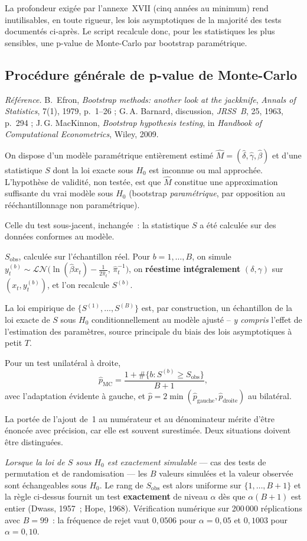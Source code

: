 \documentclass[a4paper,11pt]{article}
\newcommand{\refl}[1]{{\small\textcolor{maincolor!70!black}{\textit{Référence.} #1}}\par\smallskip}
\newcounter{ficheid}
\newenvironment{fiche}[1]{%
  \stepcounter{ficheid}%
  \phantomsection
  \subsection{#1}%
  \label{fiche:\theficheid}%
}{%
  \end{description}\vspace{0.5em}%
}
\newcommand{\Cadre}{%
  \begin{description}[leftmargin=0pt, style=unboxed, itemsep=3pt, topsep=3pt, parsep=2pt]%
  \item[\textcolor{financeblue}{\textbf{1. Cadre, notations et hypothèses de validité (non testées).}}]}
\newcommand{\Hzero}{\item[\textcolor{financeblue}{\textbf{2. Hypothèse nulle.}}]}
\newcommand{\Stat}{\item[\textcolor{financeblue}{\textbf{3. Statistique de test.}}]}
\newcommand{\Loi}{\item[\textcolor{financeblue}{\textbf{4. Loi sous $H_0$.}}]}
\newcommand{\Pval}{\item[\textcolor{financeblue}{\textbf{5. p-value.}}]}
\begin{document}
La profondeur exigée par l'annexe~XVII (cinq années au minimum) rend inutilisables, en toute
rigueur, les lois asymptotiques de la majorité des tests documentés ci-après. Le script
recalcule donc, pour les statistiques les plus sensibles, une p-value de Monte-Carlo par
bootstrap paramétrique.

\begin{fiche}{Procédure générale de p-value de Monte-Carlo}
\refl{B.~Efron, \emph{Bootstrap methods: another look at the jackknife}, \emph{Annals of
Statistics}, 7(1), 1979, p.~1--26 ; G.\,A. Barnard, discussion, \emph{JRSS~B}, 25, 1963, p.~294 ;
J.\,G. MacKinnon, \emph{Bootstrap hypothesis testing}, in \emph{Handbook of Computational
Econometrics}, Wiley, 2009.}
\Cadre
On dispose d'un modèle paramétrique entièrement estimé
$\widehat{M} = (\hat\delta,\hat\gamma,\hat\beta)$ et d'une statistique $S$ dont la loi exacte sous
$H_0$ est inconnue ou mal approchée. L'hypothèse de validité, non testée, est que $\widehat{M}$
constitue une approximation suffisante du vrai modèle sous $H_0$ (bootstrap \emph{paramétrique},
par opposition au rééchantillonnage non paramétrique).
\Hzero
Celle du test sous-jacent, inchangée~: la statistique $S$ a été calculée sur des données conformes
au modèle.
\Stat
$S_{\text{obs}}$, calculée sur l'échantillon réel. Pour $b = 1,\dots,B$, on simule
$y_t^{(b)} \sim \mathcal{LN}\!\big(\ln(\hat\beta x_t) - \tfrac{1}{2\hat\pi_t},\, \hat\pi_t^{-1}\big)$,
on \textbf{réestime intégralement} $(\delta,\gamma)$ sur $(x_t, y_t^{(b)})$, et l'on recalcule
$S^{(b)}$.
\Loi
La loi empirique de $\{S^{(1)},\dots,S^{(B)}\}$ est, par construction, un échantillon de la loi
exacte de $S$ sous $H_0$ conditionnellement au modèle ajusté -- \emph{y compris} l'effet de
l'estimation des paramètres, source principale du biais des lois asymptotiques à petit $T$.
\Pval
Pour un test unilatéral à droite,
\[
  \hat p_{\text{MC}} = \frac{1 + \#\{b : S^{(b)} \ge S_{\text{obs}}\}}{B+1},
\]
avec l'adaptation évidente à gauche, et
$\hat p = 2\min(\hat p_{\text{gauche}}, \hat p_{\text{droite}})$ au bilatéral.

\medskip
La portée de l'ajout de~1 au numérateur et au dénominateur mérite d'être énoncée avec précision,
car elle est souvent surestimée. Deux situations doivent être distinguées.

\emph{Lorsque la loi de $S$ sous $H_0$ est exactement simulable} --- cas des tests de
permutation et de randomisation --- les $B$ valeurs simulées et la valeur observée sont
échangeables sous $H_0$. Le rang de $S_{\text{obs}}$ est alors uniforme sur $\{1,\dots,B+1\}$ et
la règle ci-dessus fournit un test \textbf{exactement} de niveau $\alpha$ dès que $\alpha(B+1)$
est entier (Dwass, 1957~; Hope, 1968). Vérification numérique sur 200\,000
réplications avec $B = 99$~: la fréquence de rejet vaut $0{,}0506$ pour $\alpha = 0{,}05$ et
$0{,}1003$ pour $\alpha = 0{,}10$.


\end{fiche}
\end{document}
